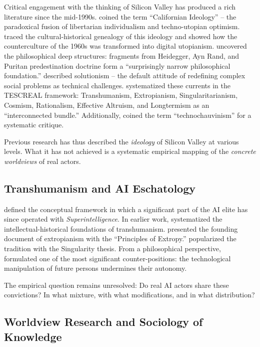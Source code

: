 \documentclass[12pt,a4paper]{article}
\begin{document}
Critical engagement with the thinking of Silicon Valley has produced a rich literature since the mid-1990s. \citet{BarbCam1996} coined the term ``Californian Ideology'' -- the paradoxical fusion of libertarian individualism and techno-utopian optimism. \citet{Turner2006} traced the cultural-historical genealogy of this ideology and showed how the counterculture of the 1960s was transformed into digital utopianism. \citet{Daub2020} uncovered the philosophical deep structures: fragments from Heidegger, Ayn Rand, and Puritan predestination doctrine form a ``surprisingly narrow philosophical foundation.'' \citet{Morozov2013} described solutionism -- the default attitude of redefining complex social problems as technical challenges. \citet{TorresGebru2024} systematized these currents in the TESCREAL framework: Transhumanism, Extropianism, Singularitarianism, Cosmism, Rationalism, Effective Altruism, and Longtermism as an ``interconnected bundle.'' Additionally, \citet{Broussard2018} coined the term ``technochauvinism'' for a systematic critique.

Previous research has thus described the \emph{ideology} of Silicon Valley at various levels. What it has not achieved is a systematic empirical mapping of the \emph{concrete worldviews} of real actors.


\subsection{Transhumanism and AI Eschatology}
\label{sec:forschungsstand:transhumanismus}

\citet{Bostrom2014} defined the conceptual framework in which a significant part of the AI elite has since operated with \emph{Superintelligence}. In earlier work, \citet{Bostrom2005} systematized the intellectual-historical foundations of transhumanism. \citet{More2003} presented the founding document of extropianism with the ``Principles of Extropy.'' \citet{Kurzweil2005} popularized the tradition with the Singularity thesis. From a philosophical perspective, \citet{Habermas2001} formulated one of the most significant counter-positions: the technological manipulation of future persons undermines their autonomy.

The empirical question remains unresolved: Do real AI actors share these convictions? In what mixture, with what modifications, and in what distribution?


\subsection{Worldview Research and Sociology of Knowledge}
\label{sec:forschungsstand:wissenssoziologie}
\end{document}
